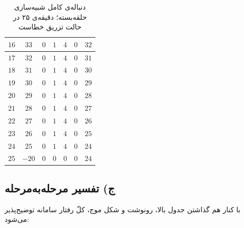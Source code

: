 \documentclass[12pt,a4paper]{article}
\begin{document}
\begin{table}[H]
\begin{tabular}{|c|c|c|c|c|c|c|}
			\(16\) & \(33\)  & \(0\) & \(1\) & \(4\) & \(0\) & \(32\) \\ \hline
			\(17\) & \(32\)  & \(0\) & \(1\) & \(4\) & \(0\) & \(31\) \\ \hline
			\(18\) & \(31\)  & \(0\) & \(1\) & \(4\) & \(0\) & \(30\) \\ \hline
			\(19\) & \(30\)  & \(0\) & \(1\) & \(4\) & \(0\) & \(29\) \\ \hline
			\(20\) & \(29\)  & \(0\) & \(1\) & \(4\) & \(0\) & \(28\) \\ \hline
			\(21\) & \(28\)  & \(0\) & \(1\) & \(4\) & \(0\) & \(27\) \\ \hline
			\(22\) & \(27\)  & \(0\) & \(1\) & \(4\) & \(0\) & \(26\) \\ \hline
			\(23\) & \(26\)  & \(0\) & \(1\) & \(4\) & \(0\) & \(25\) \\ \hline
			\(24\) & \(25\)  & \(0\) & \(1\) & \(4\) & \(0\) & \(24\) \\ \hline
			\(25\) & \(-20\) & \(0\) & \(0\) & \(0\) & \(0\) & \(24\) \\ \hline
		\end{tabular}
		\caption{دنباله‌ی کامل شبیه‌سازی حلقه‌بسته؛ دقیقه‌ی ۲۵ در حالت تزریق خطاست}
	\end{table}



	\subsection*{ج) تفسیر مرحله‌به‌مرحله}
	با کنار هم گذاشتن جدول بالا، رونوشت و شکل موج، کلّ رفتار سامانه توضیح‌پذیر می‌شود:
\end{document}
